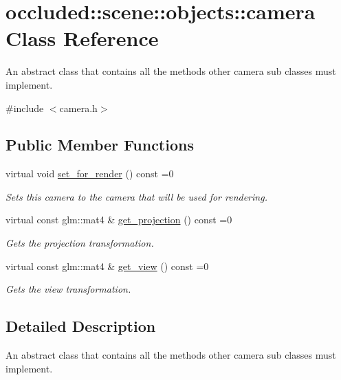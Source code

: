 \hypertarget{classoccluded_1_1scene_1_1objects_1_1camera}{\section{occluded\+:\+:scene\+:\+:objects\+:\+:camera Class Reference}
\label{classoccluded_1_1scene_1_1objects_1_1camera}
}


An abstract class that contains all the methods other camera sub classes must implement.  




{\ttfamily \#include $<$camera.\+h$>$}

\subsection*{Public Member Functions}
\begin{DoxyCompactItemize}
\item 
virtual void \hyperlink{classoccluded_1_1scene_1_1objects_1_1camera_a4e62fa6846f1009409a7ed87fe03f8ca}{set\+\_\+for\+\_\+render} () const =0
\begin{DoxyCompactList}\small\item\em Sets this camera to the camera that will be used for rendering. \end{DoxyCompactList}\item 
virtual const glm\+::mat4 \& \hyperlink{classoccluded_1_1scene_1_1objects_1_1camera_ae045f6f1549e58c3211e75a708f8f490}{get\+\_\+projection} () const =0
\begin{DoxyCompactList}\small\item\em Gets the projection transformation. \end{DoxyCompactList}\item 
virtual const glm\+::mat4 \& \hyperlink{classoccluded_1_1scene_1_1objects_1_1camera_aa4168c8ffacdf6a3eb52b528d4780d4e}{get\+\_\+view} () const =0
\begin{DoxyCompactList}\small\item\em Gets the view transformation. \end{DoxyCompactList}\end{DoxyCompactItemize}


\subsection{Detailed Description}
An abstract class that contains all the methods other camera sub classes must implement. 

